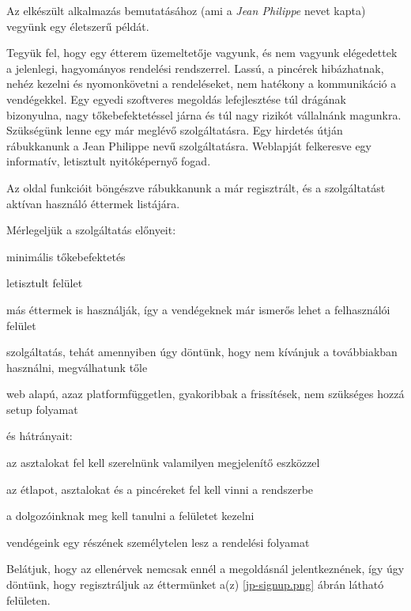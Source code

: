 Az elkészült alkalmazás bemutatásához (ami a \emph{Jean Philippe} nevet kapta) vegyünk egy életszerű példát. \par

Tegyük fel, hogy egy étterem üzemeltetője vagyunk, és nem vagyunk elégedettek a jelenlegi, hagyományos rendelési rendszerrel. Lassú, a pincérek hibázhatnak, nehéz kezelni és nyomonkövetni a rendeléseket, nem hatékony a kommunikáció a vendégekkel. Egy egyedi szoftveres megoldás lefejlesztése túl drágának bizonyulna, nagy tőkebefektetéssel járna és túl nagy rizikót vállalnánk magunkra. Szükségünk lenne egy már meglévő szolgáltatásra. Egy hirdetés útján rábukkanunk a Jean Philippe nevű szolgáltatásra. Weblapját felkeresve egy informatív, letisztult nyitóképernyő fogad. 


Az oldal funkcióit böngészve rábukkanunk a már regisztrált, és a szolgáltatást aktívan használó éttermek listájára.


Mérlegeljük a szolgáltatás előnyeit:

\begin{listing}
	\item minimális tőkebefektetés
	\item letisztult felület
	\item más éttermek is használják, így a vendégeknek már ismerős lehet a felhasználói felület
	\item szolgáltatás, tehát amennyiben úgy döntünk, hogy nem kívánjuk a továbbiakban használni, megválhatunk tőle
	\item web alapú, azaz platformfüggetlen, gyakoribbak a frissítések, nem szükséges hozzá setup folyamat
\end{listing}

és hátrányait:

\begin{listing}
	\item az asztalokat fel kell szerelnünk valamilyen megjelenítő eszközzel
	\item az étlapot, asztalokat és a pincéreket fel kell vinni a rendszerbe
	\item a dolgozóinknak meg kell tanulni a felületet kezelni
	\item vendégeink egy részének személytelen lesz a rendelési folyamat
\end{listing}

Belátjuk, hogy az ellenérvek nemcsak ennél a megoldásnál jelentkeznének, így úgy döntünk, hogy regisztráljuk az éttermünket a(z) \ref{jp-signup.png} ábrán látható felületen.

